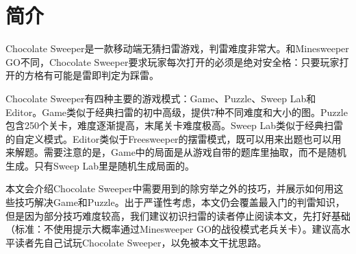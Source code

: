 \section{简介}
Chocolate Sweeper是一款移动端无猜扫雷游戏，判雷难度非常大。和Minesweeper GO不同，Chocolate Sweeper要求玩家每次打开的必须是绝对安全格：只要玩家打开的方格有可能是雷即判定为踩雷。

Chocolate Sweeper有四种主要的游戏模式：Game、Puzzle、Sweep Lab和Editor。Game类似于经典扫雷的初中高级，提供7种不同难度和大小的图。Puzzle包含250个关卡，难度逐渐提高，末尾关卡难度极高。Sweep Lab类似于经典扫雷的自定义模式。Editor类似于Freesweeper的摆雷模式，既可以用来出题也可以用来解题。需要注意的是，Game中的局面是从游戏自带的题库里抽取，而不是随机生成。只有Sweep Lab里是随机生成局面的。

本文会介绍Chocolate Sweeper中需要用到的除穷举之外的技巧，并展示如何用这些技巧解决Game和Puzzle。出于严谨性考虑，本文仍会覆盖最入门的判雷知识，但是因为部分技巧难度较高，我们建议初识扫雷的读者停止阅读本文，先打好基础（标准：不使用提示大概率通过Minesweeper GO的战役模式老兵关卡）。建议高水平读者先自己试玩Chocolate Sweeper，以免被本文干扰思路。